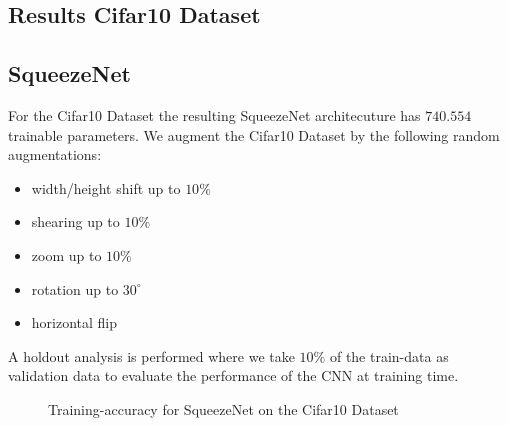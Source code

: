 \documentclass[11pt]{article}
\begin{document}
\subsection{Results Cifar10 Dataset}

\subsection{SqueezeNet}
For the Cifar10 Dataset the resulting SqueezeNet architecuture has $740.554$ trainable parameters. We augment the Cifar10 Dataset by the following random augmentations:
%
\begin{itemize}
	\item width/height shift up to $10\%$
	\item shearing up to $10\%$
	\item zoom up to $10\%$
	\item rotation up to $30^\circ$
	\item horizontal flip
\end{itemize}
%
A holdout analysis is performed where we take $10\%$ of the train-data as validation data to evaluate the performance of the CNN at training time. 

\begin{figure}
\centering
{}
  \hfill
  \hfill
\caption{Training-accuracy for SqueezeNet on the Cifar10 Dataset}
\label{rescnn::1}
\end{figure}
\end{document}
